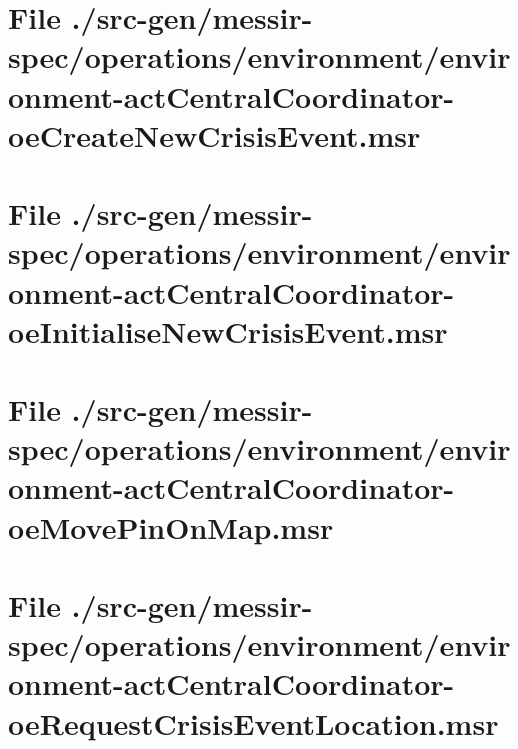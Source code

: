 \section[File /src-gen.../environment-actCentralCoordinator-oeCreateNewCrisisEvent.msr]{File ./src-gen/messir-spec/operations/environment/environment-actCentralCoordinator-oeCreateNewCrisisEvent.msr}
\scriptsize

\normalsize
	
\section[File /.../environment-actCentralCoordinator-oeInitialiseNewCrisisEvent.msr]{File ./src-gen/messir-spec/operations/environment/environment-actCentralCoordinator-oeInitialiseNewCrisisEvent.msr}
\scriptsize

\normalsize
	
\section[File /src-gen.../environment-actCentralCoordinator-oeMovePinOnMap.msr]{File ./src-gen/messir-spec/operations/environment/environment-actCentralCoordinator-oeMovePinOnMap.msr}
\scriptsize

\normalsize
	
\section[File /.../environment-actCentralCoordinator-oeRequestCrisisEventLocation.msr]{File ./src-gen/messir-spec/operations/environment/environment-actCentralCoordinator-oeRequestCrisisEventLocation.msr}
\scriptsize

\normalsize
	
